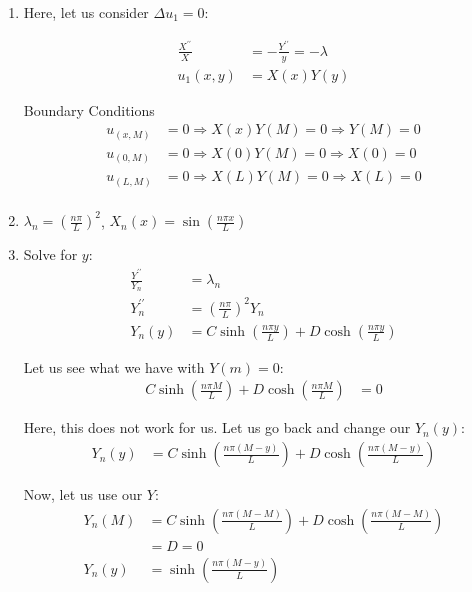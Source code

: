 \begin{enumerate}
  \item Here, let us consider $\Delta u_1 = 0$:

  \begin{align}
    \frac{X^{\prime\prime}}{X} & = -\frac{Y^{\prime\prime}}{y} = -\lambda\\
    u_1(x, y) & = X(x)Y(y)
  \end{align}

  Boundary Conditions
  \begin{align}
    u_(x, M) & = 0 \Rightarrow X(x)Y(M) = 0 \Rightarrow Y(M) = 0\\
    u_(0, M) & = 0 \Rightarrow X(0)Y(M) = 0 \Rightarrow X(0) = 0\\
    u_(L, M) & = 0 \Rightarrow X(L)Y(M) = 0 \Rightarrow X(L) = 0\\
  \end{align}

\item $\lambda_n = \left( \frac{n \pi}{L} \right)^2$, $X_n(x) = \sin\left( \frac{n \pi x}{L} \right)$

\item Solve for $y$:
%
\begin{align}
  \frac{Y^{\prime\prime}}{Y_n} & = \lambda_n\\
  Y^{\prime\prime}_n & = \left( \frac{n \pi}{L} \right)^2 Y_n\\
  Y_n(y) & = C\sinh \left( \frac{n \pi y}{L} \right) + D \cosh \left( \frac{n \pi y}{L} \right)
\end{align}

Let us see what we have with $Y(m) = 0$:
%
\begin{align}
  C \sinh \left( \frac{n \pi M}{L} \right) + D \cosh \left( \frac{n \pi M}{L} \right) & = 0
\end{align}

Here, this does not work for us. Let us go back and change our $Y_n(y)$:
%
\begin{align}
  Y_n(y) & = C \sinh \left(\frac{n \pi (M - y)}{L} \right) + D \cosh \left( \frac{n \pi (M - y)}{L} \right)
\end{align}

Now, let us use our $Y$:
%
\begin{align}
  Y_n(M) & = C \sinh \left(\frac{n \pi (M - M)}{L} \right) + D \cosh \left( \frac{n \pi (M - M)}{L} \right)\\
  & = D = 0\\
  Y_n(y) & = \sinh\left( \frac{n \pi (M -y)}{L} \right)
\end{align}


\end{enumerate}
